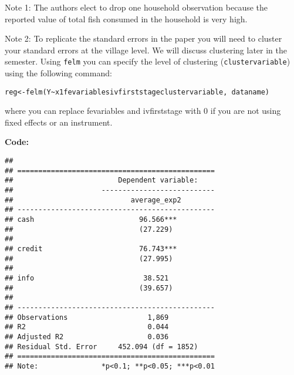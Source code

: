 \documentclass[
]{article}
\newenvironment{Shaded}{\begin{snugshade}}{\end{snugshade}}
\newcommand{\AttributeTok}[1]{\textcolor[rgb]{0.13,0.29,0.53}{#1}}
\newcommand{\ConstantTok}[1]{\textcolor[rgb]{0.56,0.35,0.01}{#1}}
\newcommand{\DecValTok}[1]{\textcolor[rgb]{0.00,0.00,0.81}{#1}}
\newcommand{\FloatTok}[1]{\textcolor[rgb]{0.00,0.00,0.81}{#1}}
\newcommand{\FunctionTok}[1]{\textcolor[rgb]{0.13,0.29,0.53}{\textbf{#1}}}
\newcommand{\NormalTok}[1]{#1}
\newcommand{\OtherTok}[1]{\textcolor[rgb]{0.56,0.35,0.01}{#1}}
\newcommand{\SpecialCharTok}[1]{\textcolor[rgb]{0.81,0.36,0.00}{\textbf{#1}}}
\newcommand{\StringTok}[1]{\textcolor[rgb]{0.31,0.60,0.02}{#1}}
\begin{document}
Note 1: The authors elect to drop one household observation because the
reported value of total fish consumed in the household is very high.

Note 2: To replicate the standard errors in the paper you will need to
cluster your standard errors at the village level. We will discuss
clustering later in the semester. Using \texttt{felm} you can specify
the level of clustering (\texttt{clustervariable}) using the following
command:

\texttt{reg\textless{}-felm(Y\textasciitilde{}x1\textbar{}fevariables\textbar{}ivfirststage\textbar{}clustervariable,\ dataname)}

where you can replace fevariables and ivfirststage with 0 if you are not
using fixed effects or an instrument.

\textbf{Code:}

\begin{Shaded}
\end{Shaded}

\begin{verbatim}
## 
## ===============================================
##                         Dependent variable:    
##                     ---------------------------
##                            average_exp2        
## -----------------------------------------------
## cash                         96.566***         
##                              (27.229)          
##                                                
## credit                       76.743***         
##                              (27.995)          
##                                                
## info                          38.521           
##                              (39.657)          
##                                                
## -----------------------------------------------
## Observations                   1,869           
## R2                             0.044           
## Adjusted R2                    0.036           
## Residual Std. Error     452.094 (df = 1852)    
## ===============================================
## Note:               *p<0.1; **p<0.05; ***p<0.01
\end{verbatim}
\end{document}
